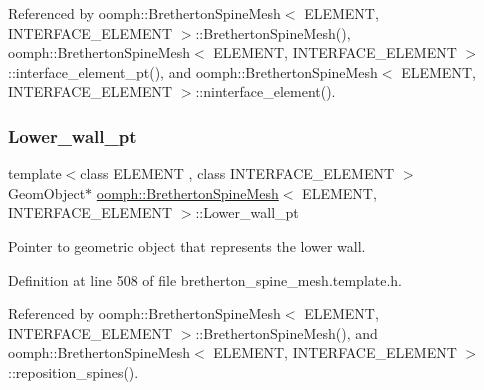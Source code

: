 Referenced by oomph\+::\+Bretherton\+Spine\+Mesh$<$ E\+L\+E\+M\+E\+N\+T, I\+N\+T\+E\+R\+F\+A\+C\+E\+\_\+\+E\+L\+E\+M\+E\+N\+T $>$\+::\+Bretherton\+Spine\+Mesh(), oomph\+::\+Bretherton\+Spine\+Mesh$<$ E\+L\+E\+M\+E\+N\+T, I\+N\+T\+E\+R\+F\+A\+C\+E\+\_\+\+E\+L\+E\+M\+E\+N\+T $>$\+::interface\+\_\+element\+\_\+pt(), and oomph\+::\+Bretherton\+Spine\+Mesh$<$ E\+L\+E\+M\+E\+N\+T, I\+N\+T\+E\+R\+F\+A\+C\+E\+\_\+\+E\+L\+E\+M\+E\+N\+T $>$\+::ninterface\+\_\+element().

\mbox{\label{classoomph_1_1BrethertonSpineMesh_a04c0136de66c06a34347b89f453730e1}} 
\subsubsection{\texorpdfstring{Lower\+\_\+wall\+\_\+pt}{Lower\_wall\_pt}}
{\footnotesize\ttfamily template$<$class E\+L\+E\+M\+E\+NT , class I\+N\+T\+E\+R\+F\+A\+C\+E\+\_\+\+E\+L\+E\+M\+E\+NT $>$ \\
Geom\+Object$\ast$ \hyperlink{classoomph_1_1BrethertonSpineMesh}{oomph\+::\+Bretherton\+Spine\+Mesh}$<$ E\+L\+E\+M\+E\+NT, I\+N\+T\+E\+R\+F\+A\+C\+E\+\_\+\+E\+L\+E\+M\+E\+NT $>$\+::Lower\+\_\+wall\+\_\+pt\hspace{0.3cm}{\ttfamily [protected]}}



Pointer to geometric object that represents the lower wall. 



Definition at line 508 of file bretherton\+\_\+spine\+\_\+mesh.\+template.\+h.



Referenced by oomph\+::\+Bretherton\+Spine\+Mesh$<$ E\+L\+E\+M\+E\+N\+T, I\+N\+T\+E\+R\+F\+A\+C\+E\+\_\+\+E\+L\+E\+M\+E\+N\+T $>$\+::\+Bretherton\+Spine\+Mesh(), and oomph\+::\+Bretherton\+Spine\+Mesh$<$ E\+L\+E\+M\+E\+N\+T, I\+N\+T\+E\+R\+F\+A\+C\+E\+\_\+\+E\+L\+E\+M\+E\+N\+T $>$\+::reposition\+\_\+spines().

\mbox{\label{classoomph_1_1BrethertonSpineMesh_a4ba20dfa61b6c342f2defbc0cdb47851}} 
